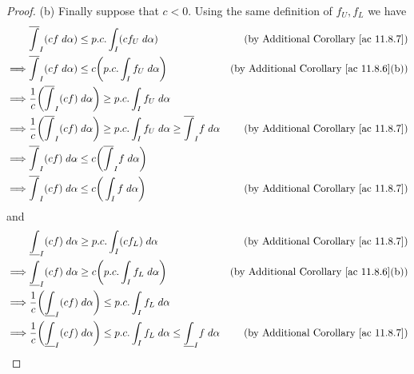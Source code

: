 \begin{proof}{(b)}
    Finally suppose that \(c < 0\).
    Using the same definition of \(f_U, f_L\) we have
    \begin{align*}
                 & \overline{\int}_I (cf \; d \alpha) \leq p.c. \int_I (c f_U \; d \alpha)                                                          & \text{(by Additional Corollary \ref{ac 11.8.7})}    \\
        \implies & \overline{\int}_I (cf \; d \alpha) \leq c \bigg(p.c. \int_I f_U \; d \alpha\bigg)                                                & \text{(by Additional Corollary \ref{ac 11.8.6}(b))} \\
        \implies & \frac{1}{c} \bigg(\overline{\int}_I (cf) \; d \alpha\bigg) \geq p.c. \int_I f_U \; d \alpha                                                                                            \\
        \implies & \frac{1}{c} \bigg(\overline{\int}_I (cf) \; d \alpha\bigg) \geq p.c. \int_I f_U \; d \alpha \geq \overline{\int}_I f \; d \alpha & \text{(by Additional Corollary \ref{ac 11.8.7})}    \\
        \implies & \overline{\int}_I (cf) \; d \alpha \leq c\bigg(\overline{\int}_I f \; d \alpha\bigg)                                                                                                   \\
        \implies & \overline{\int}_I (cf) \; d \alpha \leq c\bigg(\int_I f \; d \alpha\bigg)                                                        & \text{(by Additional Corollary \ref{ac 11.8.7})}
    \end{align*}
    and
    \begin{align*}
                 & \underline{\int}_I (cf) \; d \alpha \geq p.c. \int_I (c f_L) \; d \alpha                                                           & \text{(by Additional Corollary \ref{ac 11.8.7})}    \\
        \implies & \underline{\int}_I (cf) \; d \alpha \geq c \bigg(p.c. \int_I f_L \; d \alpha\bigg)                                                 & \text{(by Additional Corollary \ref{ac 11.8.6}(b))} \\
        \implies & \frac{1}{c} \bigg(\underline{\int}_I (cf) \; d \alpha\bigg) \leq p.c. \int_I f_L \; d \alpha                                                                                             \\
        \implies & \frac{1}{c} \bigg(\underline{\int}_I (cf) \; d \alpha\bigg) \leq p.c. \int_I f_L \; d \alpha \leq \underline{\int}_I f \; d \alpha & \text{(by Additional Corollary \ref{ac 11.8.7})}    \\

\end{align*}
\end{proof}
